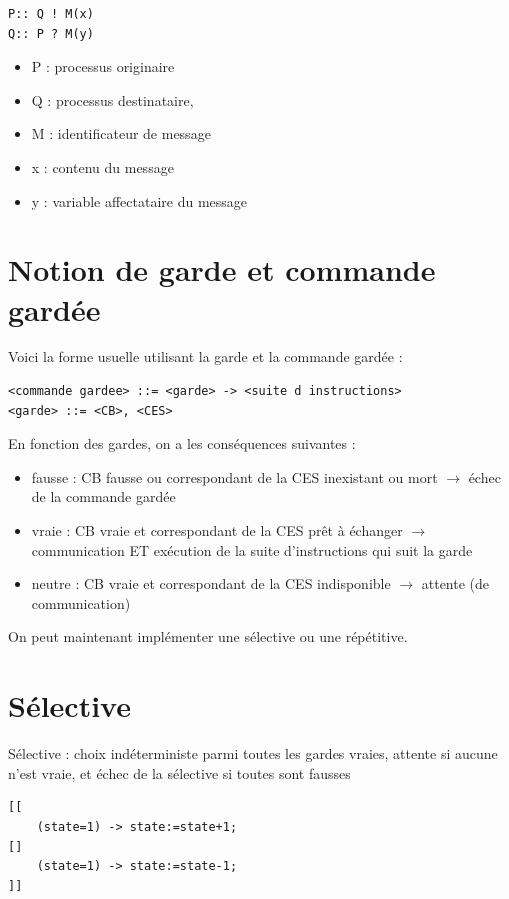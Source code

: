 \documentclass[a4paper,11pt,french]{report}
\begin{document}
\begin{lstlisting}[frame=trBL]
P:: Q ! M(x)
Q:: P ? M(y)
\end{lstlisting}
 \begin{itemize}
 \item P : processus originaire
 \item Q : processus destinataire,
 \item M : identificateur de message
 \item x : contenu du message
 \item y : variable affectataire du message
 \end{itemize}
 
 \section{Notion de garde et commande gardée}
 Voici la forme usuelle utilisant la garde et la commande gardée :
 
 \begin{lstlisting}[frame=trBL]
<commande gardee> ::= <garde> -> <suite d instructions>
<garde> ::= <CB>, <CES>
\end{lstlisting}

En fonction des gardes, on a les conséquences suivantes :
\begin{itemize}
\item fausse : CB fausse ou correspondant de la CES inexistant ou
mort $\rightarrow$ échec de la commande gardée
\item vraie : CB vraie et correspondant de la CES prêt à échanger $\rightarrow$ communication ET exécution de la suite d’instructions qui suit
la garde
\item neutre : CB vraie et correspondant de la CES indisponible $\rightarrow$
attente (de communication)
\end{itemize}

On peut maintenant implémenter une sélective ou une répétitive.

\section{Sélective}
Sélective : choix indéterministe parmi toutes les gardes vraies,
attente si aucune n’est vraie, et échec de la sélective si toutes
sont fausses

 \begin{lstlisting}[frame=trBL]
[[
	(state=1) -> state:=state+1;
[]
	(state=1) -> state:=state-1;
]]
\end{lstlisting}
\end{document}
